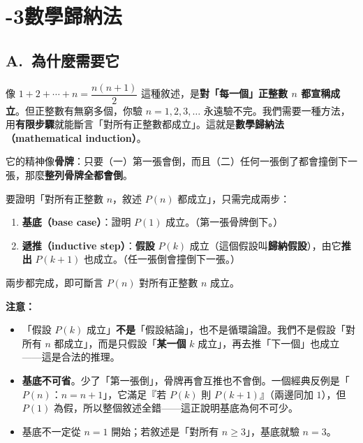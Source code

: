 \documentclass[11pt]{article}
\begin{document}
\section*{-3\quad 數學歸納法}

\subsection*{\sffamily A.\ 為什麼需要它}

像 $1+2+\cdots+n=\dfrac{n(n+1)}{2}$ 這種敘述，是\textbf{對「每一個」正整數 $n$ 都宣稱成立}。但正整數有無窮多個，你驗 $n=1,2,3,\dots$ 永遠驗不完。我們需要一種方法，用\textbf{有限步驟}就能斷言「對所有正整數都成立」。這就是\textbf{數學歸納法（mathematical induction）}。

它的精神像\textbf{骨牌}：只要（一）第一張會倒，而且（二）任何一張倒了都會撞倒下一張，那麼\textbf{整列骨牌全都會倒}。


要證明「對所有正整數 $n$，敘述 $P(n)$ 都成立」，只需完成兩步：

\begin{enumerate}\setlength{\itemsep}{2pt}
\item \textbf{基底（base case）}：證明 $P(1)$ 成立。（第一張骨牌倒下。）
\item \textbf{遞推（inductive step）}：\textbf{假設} $P(k)$ 成立（這個假設叫\textbf{歸納假設}），由它\textbf{推出} $P(k+1)$ 也成立。（任一張倒會撞倒下一張。）
\end{enumerate}
兩步都完成，即可斷言 $P(n)$ 對所有正整數 $n$ 成立。

\textbf{注意：}
\begin{itemize}\setlength{\itemsep}{1pt}
\item 「假設 $P(k)$ 成立」\textbf{不是}「假設結論」，也不是循環論證。我們不是假設「對所有 $n$ 都成立」，而是只假設「\textbf{某一個} $k$ 成立」，再去推「下一個」也成立——這是合法的推理。
\item \textbf{基底不可省}。少了「第一張倒」，骨牌再會互推也不會倒。一個經典反例是「$P(n)$：$n=n+1$」，它滿足『若 $P(k)$ 則 $P(k+1)$』（兩邊同加 $1$），但 $P(1)$ 為假，所以整個敘述全錯——這正說明基底為何不可少。
\item 基底不一定從 $n=1$ 開始；若敘述是「對所有 $n\ge3$」，基底就驗 $n=3$。
\end{itemize}
\end{document}
